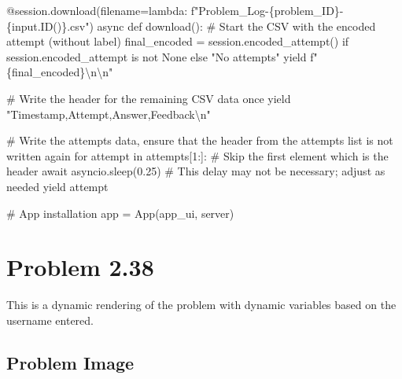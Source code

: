 \documentclass[
  letterpaper,
  DIV=11,
  numbers=noendperiod]{scrreprt}
\newenvironment{Shaded}{\begin{snugshade}}{\end{snugshade}}
\newcommand{\NormalTok}[1]{\textcolor[rgb]{0.00,0.23,0.31}{#1}}
\begin{document}
\begin{Shaded}
\begin{Highlighting}[]
\NormalTok{    @session.download(filename=lambda: f"Problem\_Log{-}\{problem\_ID\}{-}\{input.ID()\}.csv")}
\NormalTok{    async def download():}
\NormalTok{        \# Start the CSV with the encoded attempt (without label)}
\NormalTok{        final\_encoded = session.encoded\_attempt() if session.encoded\_attempt is not None else "No attempts"}
\NormalTok{        yield f"\{final\_encoded\}\textbackslash{}n\textbackslash{}n"}
        
\NormalTok{        \# Write the header for the remaining CSV data once}
\NormalTok{        yield "Timestamp,Attempt,Answer,Feedback\textbackslash{}n"}
        
\NormalTok{        \# Write the attempts data, ensure that the header from the attempts list is not written again}
\NormalTok{        for attempt in attempts[1:]:  \# Skip the first element which is the header}
\NormalTok{            await asyncio.sleep(0.25)  \# This delay may not be necessary; adjust as needed}
\NormalTok{            yield attempt}


\NormalTok{\# App installation}
\NormalTok{app = App(app\_ui, server)}
\end{Highlighting}
\end{Shaded}

\chapter*{Problem 2.38}\label{problem-2.38-2}


This is a dynamic rendering of the problem with dynamic variables based
on the username entered.

\section*{Problem Image}\label{problem-image-27}

\end{document}

